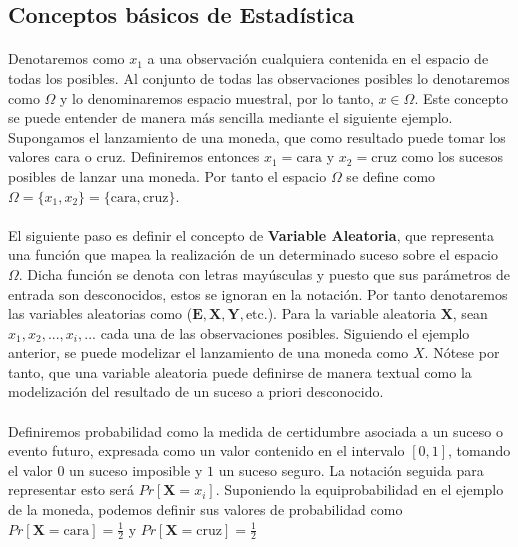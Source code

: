 \documentclass{subfiles}
\begin{document}
      \subsection{Conceptos básicos de Estadística}
      \label{sec:basic_statistics}

        \paragraph{}
        Denotaremos como $x_1$ a una observación cualquiera contenida en el espacio de todas los posibles. Al conjunto de todas las observaciones posibles lo denotaremos como $\Omega$ y lo denominaremos espacio muestral, por lo tanto, $x \in \Omega$. Este concepto se puede entender de manera más sencilla mediante el siguiente ejemplo. Supongamos el lanzamiento de una moneda, que como resultado puede tomar los valores cara o cruz. Definiremos entonces $x_1 = \text{cara}$ y $x_2 = \text{cruz}$ como los sucesos posibles de lanzar una moneda. Por tanto el espacio $\Omega$ se define como $\Omega = \{x_1, x_2\} = \{\text{cara}, \text{cruz}\}$.

        \paragraph{}
        El siguiente paso es definir el concepto de \textbf{Variable Aleatoria}, que representa una función que mapea la realización de un determinado suceso sobre el espacio $\Omega$. Dicha función se denota con letras mayúsculas y puesto que sus parámetros de entrada son desconocidos, estos se ignoran en la notación. Por tanto denotaremos las variables aleatorias como ($\boldsymbol{E}, \boldsymbol{X}, \boldsymbol{Y}, \text{etc.}$). Para la variable aleatoria $\boldsymbol{X}$, sean $x_1, x_2, ..., x_i,...$ cada una de las observaciones posibles. Siguiendo el ejemplo anterior, se puede modelizar el lanzamiento de una moneda como $X$. Nótese por tanto, que una variable aleatoria puede definirse de manera textual como la modelización del resultado de un suceso a priori desconocido.

        \paragraph{}
        Definiremos probabilidad como la medida de certidumbre asociada a un suceso o evento futuro, expresada como un valor contenido en el intervalo $[0,1]$, tomando el valor $0$ un suceso imposible y $1$ un suceso seguro. La notación seguida para representar esto será $Pr[\boldsymbol{X} = x_i]$. Suponiendo la equiprobabilidad en el ejemplo de la moneda, podemos definir sus valores de probabilidad como $Pr[\boldsymbol{X} = \text{cara}] = \tfrac{1}{2}$ y $Pr[\boldsymbol{X} = \text{cruz}] = \tfrac{1}{2}$
\end{document}
